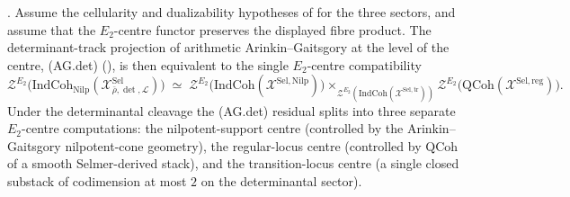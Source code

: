 \begin{theorem}
\label{v4-arith:w5-h:thm:agdet-reduction}
\ClaimStatusProvedHereConditional. Assume the cellularity and
dualizability hypotheses of
 for the three sectors, and
assume that the \(E_{2}\)-centre functor preserves the displayed
fibre product. The determinant-track projection of
arithmetic Arinkin--Gaitsgory at the level of the centre, (AG.det)
(),
is then equivalent to the single \(E_{2}\)-centre compatibility
\begin{equation}
\label{v4-arith:w5-h:eq:agdet-e2-compat}
\mathcal{Z}^{E_{2}}\bigl(\mathrm{IndCoh}_{\mathrm{Nilp}}(\mathcal{X}^{\mathrm{Sel}}_{\bar\rho,\det,\mathcal{L}})\bigr)
\;\simeq\;
\mathcal{Z}^{E_{2}}\bigl(\mathrm{IndCoh}(\mathcal{X}^{\mathrm{Sel},\mathrm{Nilp}})\bigr)
\times_{\mathcal{Z}^{E_{2}}(\mathrm{IndCoh}(\mathcal{X}^{\mathrm{Sel},\mathrm{tr}}))}
\mathcal{Z}^{E_{2}}\bigl(\mathrm{QCoh}(\mathcal{X}^{\mathrm{Sel},\mathrm{reg}})\bigr).
\end{equation}
Under the determinantal cleavage the (AG.det) residual splits into
three separate \(E_{2}\)-centre computations: the nilpotent-support
centre (controlled by the Arinkin--Gaitsgory nilpotent-cone geometry),
the regular-locus centre (controlled by \(\mathrm{QCoh}\) of a smooth
Selmer-derived stack), and the transition-locus centre (a
single closed substack of codimension at most \(2\) on the determinantal
sector).
\end{theorem}

